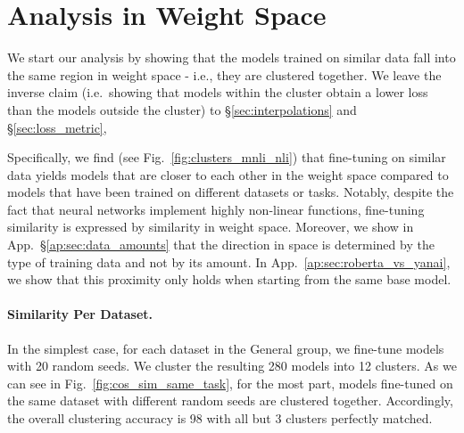 \documentclass[nohyperref]{article}
\theoremstyle{plain}
\theoremstyle{definition}
\theoremstyle{remark}
\begin{document}
\begin{figure*}[t]
\centering
\hfill
{}
\caption{Clusters of fine-tuned models on different datasets or tasks, projected by t-SNE. We find that both datasets and dataset families correspond to regions in space. In each figure, each model is represented as a dot, where the inner color is the color of the dataset/task the model was fine-tuned with and the outer color is the color of the most common dataset/task in the cluster (representing the cluster label). Datasets/tasks names are shown in legends. 
\label{fig:clusters_mnli_nli}}
\end{figure*}

\section{Analysis in Weight Space}\label{sec:analysis}

We start our analysis by showing that the models trained on similar data fall into the same region in weight space - i.e., they are clustered together.
We leave the inverse claim (i.e.\ showing that models within the cluster obtain a lower loss than the models outside the cluster) to \S\ref{sec:interpolations} and \S\ref{sec:loss_metric}, 

Specifically, we find (see Fig.~\ref{fig:clusters_mnli_nli}) that fine-tuning on similar data yields models that are closer to each other in the weight space compared to models that have been trained on different datasets or tasks. Notably, despite the fact that neural networks implement highly non-linear functions, fine-tuning similarity is expressed by similarity in weight space. Moreover, we show in App.~\S\ref{ap:sec:data_amounts} that the direction in space is determined by the type of training data and not by its amount. In App.~\ref{ap:sec:roberta_vs_yanai}, we show that this proximity only holds when starting from the same base model.

\paragraph{Similarity Per Dataset.}\label{sec:similarity_per_dataset}
In the simplest case, for each dataset in the General group, we fine-tune models with 20 random seeds. We cluster the resulting 280 models into 12 clusters.
As we can see in Fig.~\ref{fig:cos_sim_same_task}, for the most part, models fine-tuned on the same dataset with different random seeds are clustered together. Accordingly, the overall clustering accuracy is 98 with all but 3 clusters perfectly matched. %
\end{document}
